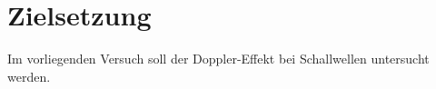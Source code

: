 \section{Zielsetzung}
\label{sec:Zielsetzung}

Im vorliegenden Versuch soll der Doppler-Effekt bei Schallwellen untersucht werden.
